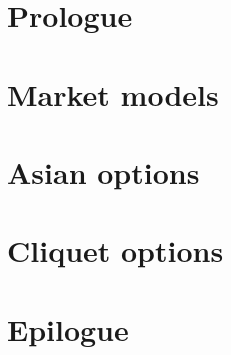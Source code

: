 \documentclass[12pt,a4paper,oneside]{amsbook}
\begin{document}
\mainmatter

\chapter{Prologue}
\label{cha:prologue}


\chapter{Market models}
\label{cha:models}


\chapter{Asian options}
\label{cha:asian}


\chapter{Cliquet options}
\label{cha:cliquet}


\chapter{Epilogue}
\label{cha:epilogue}



%


\backmatter

\listoffigures

\listoftables


\printbibliography
\end{document}
